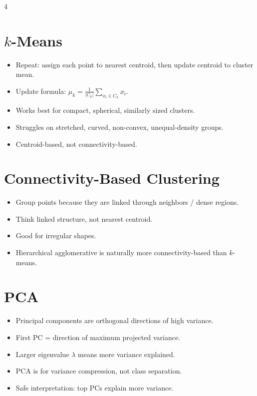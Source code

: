 \documentclass[11pt,landscape]{article}
\begin{document}
\begin{multicols}{4}
		\section{$k$-Means}
		\begin{itemize}
			\item Repeat: assign each point to nearest centroid, then update centroid to cluster mean.
			\item Update formula: $\mu_k=\frac{1}{|C_k|}\sum_{x_i\in C_k}x_i$.
			\item Works best for compact, spherical, similarly sized clusters.
			\item Struggles on stretched, curved, non-convex, unequal-density groups.
			\item Centroid-based, not connectivity-based.
		\end{itemize}
		
		\section{Connectivity-Based Clustering}
		\begin{itemize}
			\item Group points because they are linked through neighbors / dense regions.
			\item Think linked structure, not nearest centroid.
			\item Good for irregular shapes.
			\item Hierarchical agglomerative is naturally more connectivity-based than $k$-means.
		\end{itemize}
		
		\section{PCA}
		\begin{itemize}
			\item Principal components are orthogonal directions of high variance.
			\item First PC = direction of maximum projected variance.
			\item Larger eigenvalue $\lambda$ means more variance explained.
			\item PCA is for variance compression, not class separation.
			\item Safe interpretation: top PCs explain more variance.
		\end{itemize}
		

\end{multicols}
\end{document}
